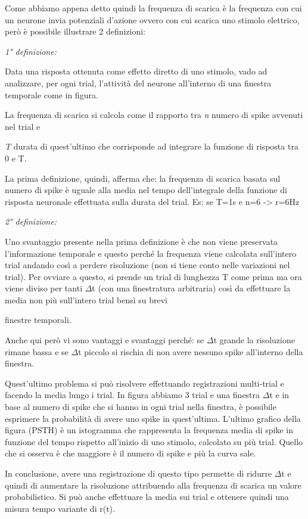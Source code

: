 \documentclass[12pt,a4paper,openany]{book}
\begin{document}
Come abbiamo appena detto quindi la frequenza di scarica è la frequenza con cui un neurone invia potenziali d'azione ovvero con cui scarica uno stimolo elettrico, però è possibile illustrare 2 definizioni:

\textit{1° definizione:}

Data una risposta ottenuta come effetto diretto di uno stimolo, vado ad analizzare, per ogni trial, l'attività del neurone all'interno di una finestra temporale come in figura.

La frequenza di scarica si calcola come il rapporto tra \textit{n }numero di spike avvenuti nel trial e

\textit{T }durata di quest'ultimo che corrisponde ad integrare la funzione di risposta tra 0 e T.

La prima definizione, quindi, afferma che: la frequenza di scarica basata sul numero di spike è uguale alla media nel tempo dell'integrale della funzione di risposta neuronale effettuata sulla durata del trial. Es: se T=1s e n=6 -> r=6Hz

\textit{2° definizione:}

Uno svantaggio presente nella prima definizione è che non viene preservata l'informazione temporale e questo perché la frequenza viene calcolata sull'intero trial andando così a perdere risoluzione (non si tiene conto nelle variazioni nel trial). Per ovviare a questo, si prende un trial di lunghezza T come prima ma ora viene diviso per tanti $\Delta$t (con una finestratura arbitraria) così da effettuare la media non più sull'intero trial bensì su brevi

finestre temporali.

Anche qui però vi sono vantaggi e svantaggi perché: se $\Delta$t grande la risoluzione rimane bassa e se $\Delta$t piccolo si rischia di non avere nessuno spike all'interno della finestra.

Quest'ultimo problema si può risolvere effettuando registrazioni multi-trial e facendo la media lungo i trial. In figura abbiamo 3 trial e una finestra $\Delta$t e in base al numero di spike che si hanno in ogni trial nella finestra, è possibile esprimere la probabilità di avere uno spike in quest'ultima. L'ultimo grafico della figura (PSTH) è un istogramma che rappresenta la frequenza media di spike in funzione del tempo rispetto all'inizio di uno stimolo, calcolato su più trial. Quello che si osserva è che maggiore è il numero di spike e più la curva sale.

In conclusione, avere una registrazione di questo tipo permette di ridurre $\Delta$t e quindi di aumentare la risoluzione attribuendo alla frequenza di scarica un valore probabilistico. Si può anche effettuare la media sui trial e ottenere quindi una misura tempo variante di r(t).
\end{document}
